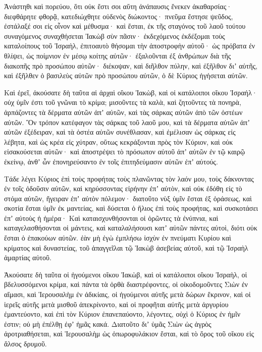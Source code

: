 \begin{spacing}{1.1}
\begin{multicols}{2}
Ἀνάστηθι καὶ πορεύου, ὅτι οὐκ ἔστι σοι αὕτη ἀνάπαυσις ἕνεκεν ἀκαθαρσίας· διεφθάρητε φθορᾷ,
κατεδιώχθητε οὐδενὸς διώκοντος· πνεῦμα ἔστησε ψεῦδος, ἐστάλαξέ σοι εἰς οἶνον καὶ μέθυσμα· καὶ ἔσται, ἐκ τῆς σταγόνος τοῦ λαοῦ τούτου
συναγόμενος συναχθήσεται Ἰακὼβ σὺν πᾶσιν· ἐκδεχόμενος ἐκδέξομαι τοὺς καταλοίπους τοῦ Ἰσραὴλ, ἐπιτοαυτὸ θήσομαι τὴν ἀποστροφὴν αὐτοῦ· ὡς πρόβατα ἐν θλίψει, ὡς ποίμνιον ἐν μέσῳ κοίτης αὐτῶν· ἐξαλοῦνται ἐξ ἀνθρώπων
διὰ τῆς διακοπῆς πρὸ προσώπου αὐτῶν· διέκοψαν, καὶ διῆλθον πύλην, καὶ ἐξῆλθον διʼ αὐτῆς, καὶ ἐξῆλθεν ὁ βασιλεὺς αὐτῶν πρὸ προσώπου αὐτῶν, ὁ δὲ Κύριος ἡγήσεται αὐτῶν.

Καὶ ἐρεῖ, ἀκούσατε δὴ ταῦτα αἱ ἀρχαὶ οἴκου Ἰακὼβ, καὶ οἱ κατάλοιποι οἴκου Ἰσραήλ· οὐχ ὑμῖν ἐστι τοῦ γνῶναι τὸ κρίμα;
μισοῦντες τὰ καλὰ, καὶ ζητοῦντες τὰ πονηρὰ, ἁρπάζοντες τὰ δέρματα αὐτῶν ἀπʼ αὐτῶν, καὶ τὰς σάρκας αὐτῶν ἀπὸ τῶν ὀστέων αὐτῶν.
Ὃν τρόπον κατέφαγον τὰς σάρκας τοῦ λαοῦ μου, καὶ τὰ δέρματα αὐτῶν ἀπʼ αὐτῶν ἐξέδειραν, καὶ τὰ ὀστέα αὐτῶν συνέθλασαν, καὶ ἐμέλισαν ὡς σάρκας εἰς λέβητα, καὶ ὡς κρέα εἰς χύτραν,
οὕτως κεκράξονται πρὸς τὸν Κύριον, καὶ οὐκ εἰσακούσεται αὐτῶν· καὶ ἀποστρέψει τὸ πρόσωπον αὐτοῦ ἀπʼ αὐτῶν ἐν τῷ καιρῷ ἐκείνῳ, ἀνθʼ ὧν ἐπονηρεύσαντο ἐν τοῖς ἐπιτηδεύμασιν αὐτῶν ἐπʼ αὐτούς.

Τάδε λέγει Κύριος ἐπὶ τοὺς προφήτας τοὺς πλανῶντας τὸν λαόν μου, τοὺς δάκνοντας ἐν τοῖς ὀδοῦσιν αὐτῶν, καὶ κηρύσσοντας εἰρήνην ἐπʼ αὐτὸν, καὶ οὐκ ἐδόθη εἰς τὸ στόμα αὐτῶν, ἤγειραν ἐπʼ αὐτὸν πόλεμον·
διατοῦτο νὺξ ὑμῖν ἔσται ἐξ ὁράσεως, καὶ σκοτία ἔσται ὑμῖν ἐκ μαντείας, καὶ δύσεται ὁ ἥλιος ἐπὶ τοὺς προφήτας, καὶ συσκοτάσει ἐπʼ αὐτοὺς ἡ ἡμέρα·
Καὶ καταισχυνθήσονται οἱ ὁρῶντες τὰ ἐνύπνια, καὶ καταγελασθήσονται οἱ μάντεις, καὶ καταλαλήσουσι κατʼ αὐτῶν πάντες αὐτοὶ, διότι οὐκ ἔσται ὁ ἐπακούων αὐτῶν.
ἐὰν μὴ ἐγὼ ἐμπλήσω ἰσχὺν ἐν πνεύματι Κυρίου καὶ κρίματος καὶ δυναστείας, τοῦ ἀπαγγεῖλαι τῷ Ἰακὼβ ἀσεβείας αὐτοῦ, καὶ τῷ Ἰσραὴλ ἁμαρτίας αὐτοῦ.

Ἀκούσατε δὴ ταῦτα οἱ ἡγούμενοι οἴκου Ἰακὼβ, καὶ οἱ κατάλοιποι οἴκου Ἰσραὴλ, οἱ βδελυσσόμενοι κρίμα, καὶ πάντα τὰ ὀρθὰ διαστρέφοντες,
οἱ οἰκοδομοῦντες Σιὼν ἐν αἵμασι, καὶ Ἱερουσαλὴμ ἐν ἀδικίαις,
οἱ ἡγούμενοι αὐτῆς μετὰ δώρων ἔκρινον, καὶ οἱ ἱερεῖς αὐτῆς μετὰ μισθοῦ ἀπεκρίνοντο, καὶ οἱ προφῆται αὐτῆς μετὰ ἀργυρίου ἐμαντεύοντο, καὶ ἐπὶ τὸν Κύριον ἐπανεπαύοντο, λέγοντες, οὐχὶ ὁ Κύριος ἐν ἡμῖν ἐστιν; οὐ μὴ ἐπέλθῃ ἐφʼ ἡμᾶς κακά.
Διατοῦτο διʼ ὑμᾶς Σιὼν ὡς ἀγρὸς ἀροτριαθήσεται, καὶ Ἱερουσαλὴμ ὡς ὀπωροφυλάκιον ἔσται, καὶ τὸ ὄρος τοῦ οἴκου εἰς ἄλσος δρυμοῦ.


\end{multicols}
\end{spacing}
